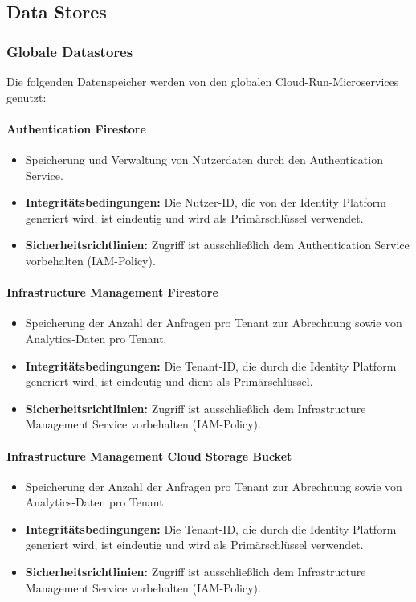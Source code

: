 \subsection{Data Stores}

\subsubsection{Globale Datastores}
Die folgenden Datenspeicher werden von den globalen Cloud-Run-Microservices genutzt:

\paragraph{Authentication Firestore}
\begin{itemize}
	\item Speicherung und Verwaltung von Nutzerdaten durch den Authentication Service.
	\item \textbf{Integritätsbedingungen:} Die Nutzer-ID, die von der Identity Platform generiert wird, ist eindeutig und wird als Primärschlüssel verwendet.
	\item \textbf{Sicherheitsrichtlinien:} Zugriff ist ausschließlich dem Authentication Service vorbehalten (IAM-Policy).
\end{itemize}

\paragraph{Infrastructure Management Firestore}
\begin{itemize}
	\item Speicherung der Anzahl der Anfragen pro Tenant zur Abrechnung sowie von Analytics-Daten pro Tenant.
	\item \textbf{Integritätsbedingungen:} Die Tenant-ID, die durch die Identity Platform generiert wird, ist eindeutig und dient als Primärschlüssel.
	\item \textbf{Sicherheitsrichtlinien:} Zugriff ist ausschließlich dem Infrastructure Management Service vorbehalten (IAM-Policy).
\end{itemize}

\paragraph{Infrastructure Management Cloud Storage Bucket}
\begin{itemize}
	\item Speicherung der Anzahl der Anfragen pro Tenant zur Abrechnung sowie von Analytics-Daten pro Tenant.
	\item \textbf{Integritätsbedingungen:} Die Tenant-ID, die durch die Identity Platform generiert wird, ist eindeutig und wird als Primärschlüssel verwendet.
	\item \textbf{Sicherheitsrichtlinien:} Zugriff ist ausschließlich dem Infrastructure Management Service vorbehalten (IAM-Policy).
\end{itemize}

